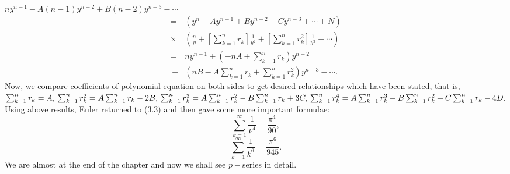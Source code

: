\documentclass[a4paper,reqno,11pt]{book}
\theoremstyle{plain}%
\theoremstyle{definition}
\begin{document}
\\
$ny^{n-1} - A(n-1)y^{n-2} + B(n-2)y^{n-3} - \cdots$
\begin{align*}
=& (y^n - Ay^{n-1} + By^{n-2} - Cy^{n-3} + \cdots \pm N)\\ \times&  \left(\frac{n}{y} + [\sum_{k=1}^{n}r_{k}]\frac{1}{y^2} + [\sum_{k=1}^{n}r_{k}^2]\frac{1}{y^3} + \cdots\right)\\
=& ny^{n-1} + \left(-nA + \sum_{k=1}^{n}r_{k}\right)y^{n-2}\\\ +& \left(nB -A\sum_{k=1}^{n}r_{k} + \sum_{k=1}^{n}r_{k}^2\right)y^{n-3} - \cdots.
\end{align*}
Now, we compare coefficients of polynomial equation on both sides to get desired relationships which have been stated, that is,\\
$\sum_{k=1}^{n}r_{k} = A,\\
\sum_{k=1}^{n}r_{k}^2 = A\sum_{k=1}^{n}r_{k} - 2B,\\
\sum_{k=1}^{n}r_{k}^3 = A\sum_{k=1}^{n}r_{k}^2 - B\sum_{k=1}^{n}r_{k} + 3C,\\
\sum_{k=1}^{n}r_{k}^4 = A\sum_{k=1}^{n}r_{k}^3 -B\sum_{k=1}^{n}r_{k}^2 + C\sum_{k=1}^{n}r_{k} - 4D.$
\\
Using above results, Euler returned to (3.3) and then gave some more important formulae:
$$\sum_{k=1}^{\infty}\frac{1}{k^4} = \frac{\pi^4}{90},$$
$$\sum_{k=1}^{\infty}\frac{1}{k^6} = \frac{\pi^6}{945}.$$
We are almost at the end of the chapter and now we shall see $p-$series in detail.\\
\end{document}
